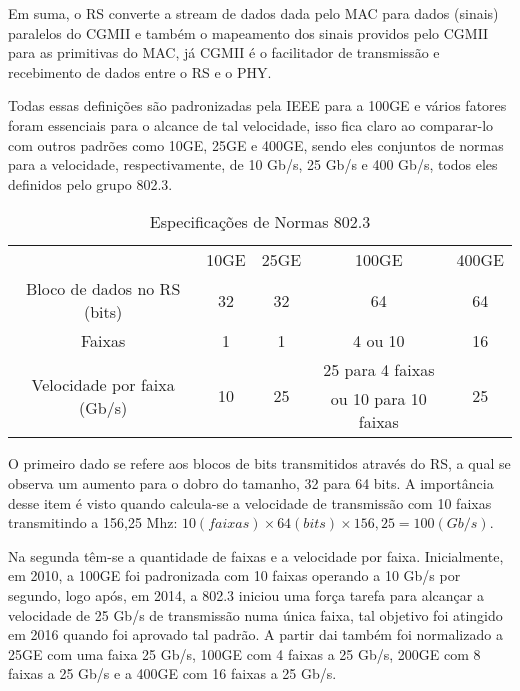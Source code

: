 \documentclass[a4paper,12pt]{article}
\begin{document}
Em suma, o RS converte a stream de dados dada pelo MAC para dados (sinais) paralelos do CGMII e também o mapeamento dos sinais providos pelo CGMII para as primitivas do MAC, já CGMII é o facilitador de transmissão e recebimento de dados entre o RS e o PHY.

Todas essas definições são padronizadas pela IEEE para a 100GE e vários fatores foram essenciais para o alcance de tal velocidade, isso fica claro ao comparar-lo com outros padrões como 10GE, 25GE e 400GE, sendo eles conjuntos de normas para a velocidade, respectivamente, de 10 Gb/s, 25 Gb/s e 400 Gb/s,  todos eles definidos pelo grupo 802.3.

\begin{center}
	\begin{table}[h!]
	\centering
		\begin{tabular}{ | c | c | c | c | c | }
			\hline
			& \multirow{2}{*}{10GE} & \multirow{2}{*}{25GE} & \multirow{2}{*}{100GE} & \multirow{2}{*}{400GE} \\
			& & & & \\
			\hline
			Bloco de dados no RS (bits) & 32 & 32 & 64 & 64 \\
			\hline
			Faixas & 1 & 1 & 4 ou 10 & 16 \\
			\hline
			\multirow{2}{*}{Velocidade por faixa (Gb/s)} & \multirow{2}{*}{10} & \multirow{2}{*}{25} &  25 para 4 faixas & \multirow{2}{*}{25} \\
			& & & ou 10 para 10 faixas & \\
			\hline
		\end{tabular}
		\centering
		\captionsetup{labelformat=empty} 
		\caption{Especificações de Normas 802.3}
	\end{table}
	
\end{center}

O primeiro dado se refere aos blocos de bits transmitidos através do RS, a qual se observa um aumento para o dobro do tamanho, 32 para 64 bits. A importância desse item é visto quando calcula-se a velocidade de transmissão com 10 faixas transmitindo a 156,25 Mhz:
$10(faixas) \times 64(bits) \times 156,25 = 100 (Gb/s)$.

Na segunda têm-se a quantidade de faixas e a velocidade por faixa. Inicialmente, em 2010, a 100GE foi padronizada com 10 faixas operando a 10 Gb/s por segundo, logo após, em 2014, a 802.3 iniciou uma força tarefa para alcançar a velocidade de 25 Gb/s de transmissão numa única faixa, tal objetivo foi atingido em 2016 quando foi aprovado tal padrão. A partir dai também foi normalizado a 25GE com uma faixa 25 Gb/s, 100GE com 4 faixas a 25 Gb/s, 200GE com 8 faixas a 25 Gb/s e a 400GE com 16 faixas a 25 Gb/s.
\end{document}
